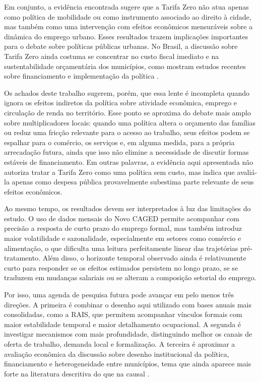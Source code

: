 \documentclass[12pt, a4paper]{article}
\begin{document}
Em conjunto, a evidência encontrada sugere que a Tarifa Zero não atua apenas como política de mobilidade ou como instrumento associado ao direito à cidade, mas também como uma intervenção com efeitos econômicos mensuráveis sobre a dinâmica do emprego urbano.
Esses resultados trazem implicações importantes para o debate sobre políticas públicas urbanas.
No Brasil, a discussão sobre Tarifa Zero ainda costuma se concentrar no custo fiscal imediato e na sustentabilidade orçamentária dos municípios, como mostram estudos recentes sobre financiamento e implementação da política \citep{pereiravermanderkeblowski2023, sampaio2024}.

Os achados deste trabalho sugerem, porém, que essa lente é incompleta quando ignora os efeitos indiretos da política sobre atividade econômica, emprego e circulação de renda no território.
Esse ponto se aproxima do debate mais amplo sobre multiplicadores locais: quando uma política altera o orçamento das famílias ou reduz uma fricção relevante para o acesso ao trabalho, seus efeitos podem se espalhar para o comércio, os serviços e, em alguma medida, para a própria arrecadação futura, ainda que isso não elimine a necessidade de discutir formas estáveis de financiamento.
Em outras palavras, a evidência aqui apresentada não autoriza tratar a Tarifa Zero como uma política sem custo, mas indica que avaliá-la apenas como despesa pública provavelmente subestima parte relevante de seus efeitos econômicos.

Ao mesmo tempo, os resultados devem ser interpretados à luz das limitações do estudo.
O uso de dados mensais do Novo CAGED permite acompanhar com precisão a resposta de curto prazo do emprego formal, mas também introduz maior volatilidade e sazonalidade, especialmente em setores como comércio e alimentação, o que dificulta uma leitura perfeitamente linear das trajetórias pré-tratamento.
Além disso, o horizonte temporal observado ainda é relativamente curto para responder se os efeitos estimados persistem no longo prazo, se se traduzem em mudanças salariais ou se alteram a composição setorial do emprego.

Por isso, uma agenda de pesquisa futura pode avançar em pelo menos três direções.
A primeira é combinar o desenho aqui utilizado com bases anuais mais consolidadas, como a RAIS, que permitem acompanhar vínculos formais com maior estabilidade temporal e maior detalhamento ocupacional.
A segunda é investigar mecanismos com mais profundidade, distinguindo melhor os canais de oferta de trabalho, demanda local e formalização.
A terceira é aproximar a avaliação econômica da discussão sobre desenho institucional da política, financiamento e heterogeneidade entre municípios, tema que ainda aparece mais forte na literatura descritiva do que na causal \citep{phillips2014, Franklin2018, pereiravermanderkeblowski2023}.
\end{document}
